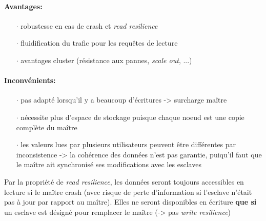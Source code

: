 {\paragraph{Avantages:}
\begin{itemize}
\item[$\cdot$]robustesse en cas de crash et \textit{read resilience}
\item[$\cdot$]fluidification du trafic pour les requêtes de lecture
\item[$\cdot$]avantages cluster (résistance aux pannes, \textit{scale out}, ...)
\end{itemize}

\paragraph{Inconvénients:}
\begin{itemize}
\item[$\cdot$]pas adapté lorsqu'il y a beaucoup d'écritures -> surcharge maître
\item[$\cdot$]nécessite plus d'espace de stockage puisque chaque noeud est une copie complète du maître
\item[$\cdot$]les valeurs lues par plusieurs utilisateurs peuvent être différentes par inconsistence -> la cohérence des données n'est pas garantie, puiqu'il faut que le maître ait synchronisé ses modifications avec les esclaves
\end{itemize}
}


\item{}
{\faux}
{Par la propriété de \textit{read resilience}, les données seront toujours accessibles en lecture si le maître crash (avec risque de perte d'information si l'esclave n'était pas à jour par rapport au maître). Elles ne seront disponibles en écriture \textbf{que si} un esclave est désigné pour remplacer le maître (-> pas \textit{write resilience})}


